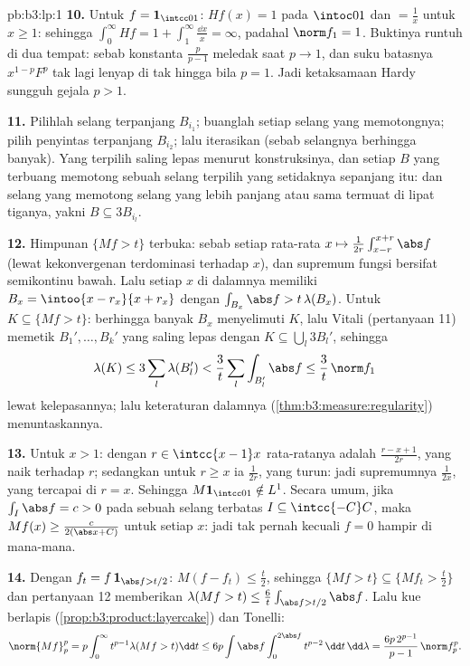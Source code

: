 \begin{solution}{pb:b3:lp:1}
\textbf{10.} Untuk $f = \mathbf 1_{\intcc01}$: $Hf(x) = 1$ pada
$\intoc01$ dan $= \frac1x$ untuk $x \geq 1$: sehingga $\int_0^\infty Hf =
1 + \int_1^\infty\frac{\dd x}x = \infty$, padahal $\norm f_1 =
1$. Buktinya runtuh di dua tempat: sebab konstanta
$\frac p{p-1}$ meledak saat $p \to 1$, dan suku batasnya
$x^{1-p}F^p$ tak lagi lenyap di tak hingga bila $p = 1$.
Jadi ketaksamaan Hardy sungguh gejala $p > 1$.

\textbf{11.} Pilihlah selang terpanjang $B_{i_1}$; buanglah
setiap selang yang memotongnya; pilih penyintas terpanjang
$B_{i_2}$; lalu iterasikan (sebab selangnya berhingga banyak). Yang terpilih
saling lepas menurut konstruksinya, dan setiap $B$ yang terbuang memotong
sebuah selang terpilih yang setidaknya sepanjang itu: dan selang yang memotong selang
yang lebih panjang atau sama termuat di lipat tiganya, yakni $B \subseteq
3B_{i_l}$.

\textbf{12.} Himpunan $\{Mf > t\}$ terbuka: sebab setiap rata-rata $x \mapsto
\frac1{2r}\int_{x-r}^{x+r}\abs f$  (lewat kekonvergenan
terdominasi terhadap $x$), dan supremum fungsi 
bersifat semikontinu bawah. Lalu setiap $x$ di dalamnya memiliki $B_x =
\intoo{x-r_x}{x+r_x}$ dengan $\int_{B_x}\abs f >
t\,\lambda(B_x)$. Untuk  $K \subseteq \{Mf > t\}$:
berhingga banyak $B_x$ menyelimuti $K$, lalu Vitali (pertanyaan 11) memetik
$B_1', \dots, B_k'$ yang saling lepas dengan $K \subseteq
\bigcup_l3B_l'$, sehingga
\[
\lambda(K) \leq 3\sum_l\lambda(B_l') <
\frac3t\sum_l\int_{B_l'}\abs f \leq \frac3t\,\norm f_1
\]
lewat kelepasannya; lalu keteraturan dalamnya
(\cref{thm:b3:measure:regularity}) menuntaskannya.

\textbf{13.} Untuk $x > 1$: dengan $r \in \intcc{x-1}x$ rata-ratanya
adalah $\frac{r - x + 1}{2r}$, yang naik terhadap $r$; sedangkan untuk $r
\geq x$ ia $\frac1{2r}$, yang turun: jadi supremumnya
$\frac1{2x}$, yang tercapai di $r = x$. Sehingga $M\mathbf 1_{\intcc01}
\notin L^1$. Secara umum, jika $\int_I\abs f = c > 0$ pada sebuah selang
terbatas $I \subseteq \intcc{-C}C$, maka $Mf(x) \geq
\frac{c}{2(\abs x + C)}$ untuk setiap $x$: jadi tak pernah 
kecuali $f = 0$ hampir di mana-mana.

\textbf{14.} Dengan $f_t = f\,\mathbf 1_{\abs f > t/2}$:
$M(f - f_t) \leq \frac t2$, sehingga $\{Mf > t\} \subseteq \{Mf_t
> \frac t2\}$ dan pertanyaan 12 memberikan $\lambda(Mf > t) \leq
\frac6t\int_{\abs f > t/2}\abs f$. Lalu kue berlapis
(\cref{prop:b3:product:layercake}) dan Tonelli:
\[
\norm{Mf}_p^p = p\int_0^\infty t^{p-1}\lambda(Mf > t)\dd t
\leq 6p\int\abs f\int_0^{2\abs f}t^{p-2}\,\dd t\,\dd\lambda
= \frac{6p\,2^{p-1}}{p-1}\,\norm f_p^p .
\]


\end{solution}

